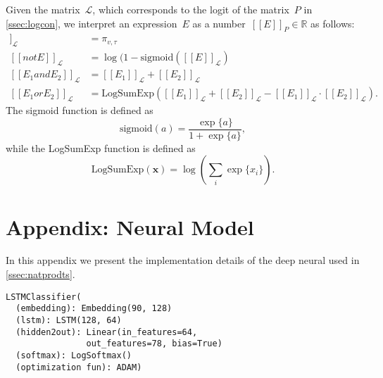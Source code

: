 \documentclass[sigplan,10pt,review,anonymous]{acmart} %
\newcommand{\qqpi}[2]{[\![#2]\!]_{#1}}
\newcommand{\margincomment}[2]{\marginpar{\scriptsize\color{Maroon}#1 says: #2}}
\newcommand{\ivp}[1]{\margincomment{IVP}{#1}}
\theoremstyle{plain}
\theoremstyle{remark}
\theoremstyle{definition}
\begin{document}
Given the matrix~$\mathcal{L}$, which corresponds to the logit of the matrix~$P$ in \cref{ssec:logcon}, we interpret an expression~$E$ as a number~$\qqpi{P}{E} \in \mathbb{R}$ as  follows:
\begin{align*}
	\qqpi{\mathcal{L}}{x_v \mathrel{is} l_\tau} & = \pi_{v,\tau}                                                \\ \label{eq:logits}
	\qqpi{\mathcal{L}}{\mathrel{not} E}         & = \log(1-\text{sigmoid}(\qqpi{\mathcal{L}}{E})                \\
	\qqpi{\mathcal{L}}{E_1 \mathrel{and} E_2}   & = \qqpi{\mathcal{L}}{E_1} \mathrel{+} \qqpi{\mathcal{L}}{E_2} \\
	\qqpi{\mathcal{L}}{E_1 \mathrel{or} E_2}    & = \text{LogSumExp}(
	\qqpi{\mathcal{L}}{E_1} + \qqpi{\mathcal{L}}{E_2} - \qqpi{\mathcal{L}}{E_1} \cdot \qqpi{\mathcal{L}}{E_2}).
\end{align*}
The sigmoid function is defined as
\begin{equation*}
	\text{sigmoid}(a) = \frac{\exp\{a\}}{1 + \exp\{a\}},
\end{equation*}
while the LogSumExp function is defined as
\begin{equation*}
	\text{LogSumExp}(\bm{x}) = \log\left( \sum_i \exp\{x_i\} \right).
\end{equation*}

\section{Appendix: Neural Model }\label{app:neural} 
In this appendix we present the implementation details of the deep neural  used in \cref{ssec:natprodts}.
\begin{lstlisting}[numbers=none,caption={Our Chararacter Level \textit{LSTM} model.},captionpos=b]
  LSTMClassifier(
  (embedding): Embedding(90, 128)
  (lstm): LSTM(128, 64)
  (hidden2out): Linear(in_features=64, 
                out_features=78, bias=True)
  (softmax): LogSoftmax()
  (optimization fun): ADAM)
\end{lstlisting}
\end{document}
